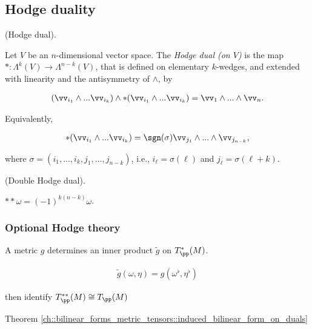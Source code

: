 
\subsection*{Hodge duality}

\begin{defn}
    (Hodge dual).
    
    Let $V$ be an $n$-dimensional vector space. The \textit{Hodge dual (on $V$)} is the map $*:\Lambda^k(V) \rightarrow \Lambda^{n - k}(V)$, that is defined on elementary $k$-wedges, and extended with linearity and the antisymmetry of $\wedge$, by
    
    \begin{align*}
        (\vv_{i_1} \wedge ... \vv_{i_k}) \wedge *(\vv_{i_1} \wedge ... \vv_{i_k}) = \vv_1 \wedge ... \wedge \vv_n.
    \end{align*}

    Equivalently,
    
    \begin{align*}
        *(\vv_{i_1} \wedge ... \vv_{i_k}) = \sgn(\sigma) \vv_{j_1} \wedge ... \wedge \vv_{j_{n - k}},
    \end{align*}
    
     where $\sigma = (i_1, ..., i_k, j_1, ..., j_{n - k})$, i.e., $i_\ell = \sigma(\ell)$ and $j_\ell = \sigma(\ell + k)$.
\end{defn}

\begin{theorem}
    (Double Hodge dual).
    
    $**\omega = (-1)^{k(n - k)} \omega$.
\end{theorem}

\subsubsection{Optional Hodge theory}

\begin{lemma}
    A metric $g$ determines an inner product $\widetilde{g}$ on $T_\pp^*(M)$.
    
    \begin{align*}
        \widetilde{g} (\omega, \eta) = g(\omega^\flat, \eta^\flat)
    \end{align*}
    
    then identify $T_\pp^{**}(M) \cong T_\pp(M)$
    
    Theorem \ref{ch::bilinear_forms_metric_tensors::induced_bilinear_form_on_duals}
    
\end{lemma}

